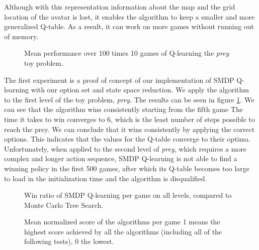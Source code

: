 Although with this representation information about the map and the grid
location of the avatar is lost, it enables the algorithm to keep a smaller and
more generalized Q-table. As a result, it can work on more games without running
out of memory.

\begin{figure}
	\centering
	\caption{Mean performance over 100 times 10 games of Q-learning the
	\textit{prey} toy problem.}
	\label{fig:qlearning}
\end{figure}

The first experiment is a proof of concept of our implementation of SMDP
Q-learning with our option set and state space reduction. We apply the algorithm to the
first level of the toy problem, \textit{prey}. The results can be seen in figure
\ref{fig:qlearning}. We can see that the algorithm wins consistently starting
from the fifth game The time it takes to win converges to 6, which is
the least number of steps possible to reach the prey. We can conclude that it
wins consistently by applying the correct options. This indicates that the
values for the Q-table converge to their optima. Unfortunately, when applied to
the second level of \textit{prey}, which requires a more complex and longer
action sequence, SMDP Q-learning is not able to find a winning policy in the
first 500 games, after which its Q-table becomes too large to load in the
initialization time and the algorithm is disqualified.

\begin{figure}
	\centering
	\vspace{-.8cm}
	\caption{Win ratio of SMDP Q-learning per game on all levels, compared to Monte Carlo Tree Search.}
	\label{fig:qlearning-wins}
	\centering
	\vspace{-.8cm}
	\caption{Mean normalized score of the algorithms per game 1 means the
	highest score achieved by all the algorithms (including all of the following
tests), 0 the lowest.}
	\label{fig:qlearning-scores}
\end{figure}


